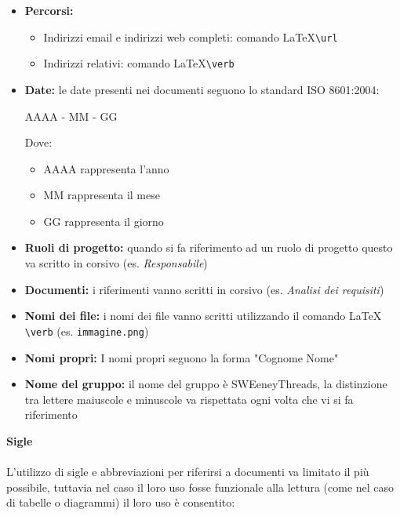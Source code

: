 \documentclass[a4paper]{report}
\begin{document}
				\begin{itemize}
					\item \textbf{Percorsi:} 
					\begin{itemize}
						\item Indirizzi email e indirizzi web completi: comando \LaTeX \space \verb|\url|
						\item Indirizzi relativi: comando \LaTeX  \space \verb|\verb|
					\end{itemize}
					\item \textbf{Date:} le date presenti nei documenti seguono lo standard ISO 8601:2004:
					\begin{center}
						AAAA - MM - GG
					\end{center}
					Dove:
					\begin{itemize}
						\item AAAA rappresenta l'anno 
						\item MM rappresenta il mese
						\item GG rappresenta il giorno
					\end{itemize}
					\item \textbf{Ruoli di progetto:} quando si fa riferimento ad un ruolo di progetto questo va scritto in corsivo
					 (es. \textit{Responsabile})
					\item \textbf{Documenti:} i riferimenti vanno scritti in corsivo (es. \textit{Analisi dei requisiti})
					\item \textbf{Nomi dei file:} i nomi dei file vanno scritti utilizzando il comando \LaTeX \space 
					\verb|\verb| (es. \verb|immagine.png|)
					\item \textbf{Nomi propri:} I nomi propri seguono la forma "Cognome Nome"
					\item \textbf{Nome del gruppo:} il nome del gruppo è SWEeneyThreads, la distinzione tra lettere maiuscole e
					 minuscole va rispettata ogni volta che vi si fa riferimento
				\end{itemize}
				\textbf{Sigle} \\ \\
				L'utilizzo di sigle e abbreviazioni per riferirsi a documenti va limitato il più possibile, tuttavia nel caso il loro uso
				 fosse funzionale alla lettura (come nel caso di tabelle o diagrammi) il loro uso è consentito:
\end{document}
